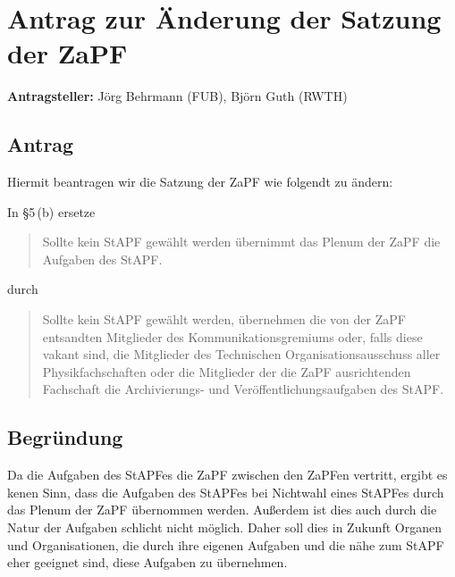 \documentclass[draft,10pt,oneside]{scrartcl}
\begin{document}
\newpage

\section*{Antrag zur Änderung der Satzung der ZaPF}

\textbf{Antragsteller:} Jörg Behrmann (FUB), Björn Guth (RWTH)

\subsection*{Antrag}

Hiermit beantragen wir die Satzung der ZaPF wie folgendt zu ändern:

In §5\,(b) ersetze
\begin{quote}
	Sollte kein StAPF gewählt werden übernimmt das Plenum der ZaPF die Aufgaben
	des StAPF.
\end{quote}
durch
\begin{quote}
	Sollte kein StAPF gewählt werden, übernehmen die von der ZaPF entsandten
	Mitglieder des Kommunikationsgremiums oder, falls diese vakant sind, die
	Mitglieder des Technischen Organisationsausschuss aller Physikfachschaften
	oder die Mitglieder der die ZaPF ausrichtenden Fachschaft die Archivierungs-
	und Veröffentlichungsaufgaben des StAPF.
\end{quote}

\subsection*{Begründung}
Da die Aufgaben des StAPFes die ZaPF zwischen den ZaPFen vertritt, ergibt es
kenen Sinn, dass die Aufgaben des StAPFes bei Nichtwahl eines StAPFes durch das
Plenum der ZaPF übernommen werden. Außerdem ist dies auch durch die Natur der
Aufgaben schlicht nicht möglich. Daher soll dies in Zukunft Organen und
Organisationen, die durch ihre eigenen Aufgaben und die nähe zum StAPF eher
geeignet sind, diese Aufgaben zu übernehmen.
\end{document}
